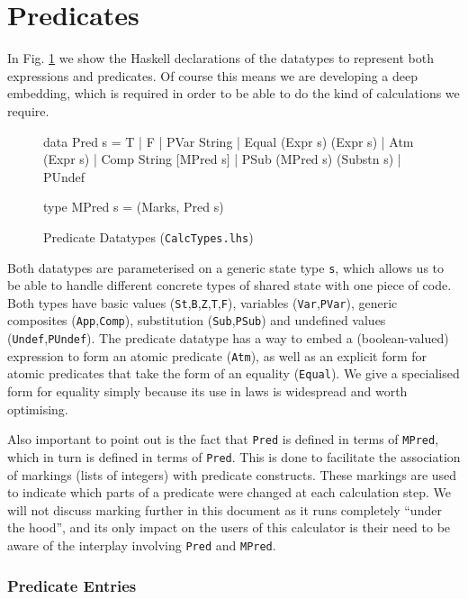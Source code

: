 \section{Predicates}\label{sec:Predicates}

In Fig. \ref{fig:pred-types} we show the Haskell declarations
of the datatypes to represent both expressions and predicates.
Of course this means we are developing a deep embedding\cite{Gibbons:2014:FDS},
which is required in order to be able to do the kind of calculations we require.
\begin{figure}[tb]
\begin{code}
data Pred s
  = T | F | PVar String | Equal (Expr s) (Expr s) | Atm (Expr s)
  | Comp String [MPred s] | PSub (MPred s) (Substn s) | PUndef

type MPred s = (Marks, Pred s)
\end{code}
  \caption{Predicate Datatypes (\texttt{CalcTypes.lhs})}
  \label{fig:pred-types}
\end{figure}
Both datatypes are parameterised on a generic state type \texttt{s},
which allows us to be able to handle different concrete types
of shared state with one piece of code.
Both types have basic values (\texttt{St},\texttt{B},\texttt{Z},\texttt{T},\texttt{F}),
variables (\texttt{Var},\texttt{PVar}),
generic composites (\texttt{App},\texttt{Comp}),
substitution (\texttt{Sub},\texttt{PSub})
and undefined values (\texttt{Undef},\texttt{PUndef}).
The predicate datatype has a way to embed a (boolean-valued)
expression to form an atomic predicate (\texttt{Atm}),
as well as an explicit form for atomic predicates that take
the form of an equality (\texttt{Equal}).
We give a specialised form for equality simply because
its use in laws is widespread and worth optimising.

Also important to point out is the fact that \texttt{Pred} is
defined in terms of \texttt{MPred}, which in turn is defined
in terms of \texttt{Pred}.
This is done to facilitate the association of markings (lists of integers)
with predicate constructs.
These markings are used to indicate which parts of a predicate
were changed at each calculation step.
We will not discuss marking further in this document
as it runs completely ``under the hood'',
and its only impact on the users of this calculator
is their need to be aware of the interplay involving \texttt{Pred} and \texttt{MPred}.

\subsubsection{Predicate Entries}~


